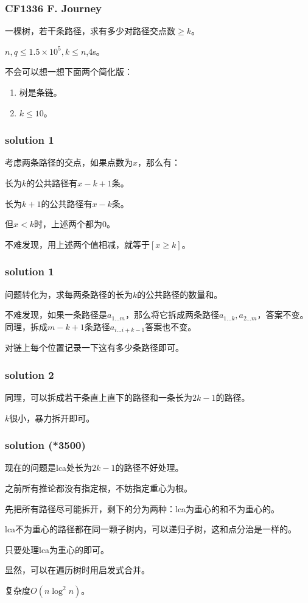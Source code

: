 \documentclass[10pt]{beamer}
\begin{document}
	\clearpage
	\begin{frame}
		\frametitle{CF1336 F. Journey}

		一棵树，若干条路径，求有多少对路径交点数$\ge k$。

		$n,q\le 1.5\times 10^5,k\le n$,4s。

		不会可以想一想下面两个简化版：

		\begin{enumerate}
			\item 树是条链。
			\item $k\le 10$。
		\end{enumerate}

	\end{frame}
	\clearpage
	\begin{frame}
		\frametitle{solution 1}
	
		考虑两条路径的交点，如果点数为$x$，那么有：

		长为$k$的公共路径有$x-k+1$条。

		长为$k+1$的公共路径有$x-k$条。

		但$x<k$时，上述两个都为$0$。

		不难发现，用上述两个值相减，就等于$[x\ge k]$。
	
	\end{frame}
	\clearpage
	\begin{frame}
		\frametitle{solution 1}
	
		问题转化为，求每两条路径的长为$k$的公共路径的数量和。
	
		不难发现，如果一条路径是$a_{1\dots m}$，那么将它拆成两条路径$a_{1\dots k},a_{2\dots m}$，答案不变。同理，拆成$m-k+1$条路径$a_{i\dots i+k-1}$答案也不变。

		对链上每个位置记录一下这有多少条路径即可。

	\end{frame}
	\clearpage
	\begin{frame}
		\frametitle{solution 2}
	
		同理，可以拆成若干条直上直下的路径和一条长为$2k-1$的路径。

		$k$很小，暴力拆开即可。
	
	\end{frame}
	\clearpage
	\begin{frame}
		\frametitle{solution (*3500)}
	
		现在的问题是lca处长为$2k-1$的路径不好处理。

		之前所有推论都没有指定根，不妨指定重心为根。

		先把所有路径尽可能拆开，剩下的分为两种：lca为重心的和不为重心的。

		lca不为重心的路径都在同一颗子树内，可以递归子树，这和点分治是一样的。

		只要处理lca为重心的即可。

		显然，可以在遍历树时用启发式合并。

		复杂度$O(n\log^2 n)$。
	
	\end{frame}
\end{document}
